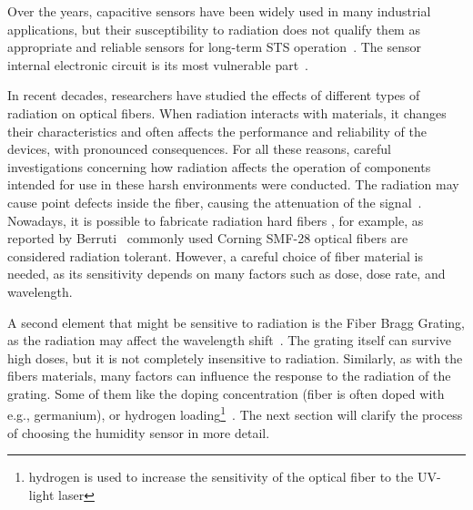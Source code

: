 Over the years, capacitive sensors have been widely used in many industrial applications, but their susceptibility to radiation does not qualify them as appropriate and reliable sensors for long-term \gls{STS} operation~\cite{Kapic, capacitive_irrad, Berruti}. The sensor internal electronic circuit is its most vulnerable part~\cite{SHCHEMEROV20222871}.

In recent decades, researchers have studied the effects of different types of radiation on optical fibers. When radiation interacts with materials, it changes their characteristics and often affects the performance and reliability of the devices, with pronounced consequences. For all these reasons, careful investigations concerning how radiation affects the operation of components intended for use in these harsh environments were conducted. The radiation may cause point defects inside the fiber, causing the attenuation of the signal~\cite{FOS_FIB_RAD}. Nowadays, it is possible to fabricate radiation hard fibers \cite{troska}, for example, as reported by Berruti~\cite{Berruti} commonly used Corning SMF-28 optical fibers are considered radiation tolerant. However, a careful choice of fiber material is needed, as its sensitivity depends on many factors such as dose, dose rate, and wavelength.  

A second element that might be sensitive to radiation is the  Fiber Bragg Grating, as the radiation may affect the wavelength shift~\cite{gusarov}. The grating itself can survive high doses, but it is not completely insensitive to radiation. Similarly, as with the fibers materials, many factors can influence the response to the radiation of the grating. Some of them like the doping concentration (fiber is often doped with e.g., germanium), or hydrogen loading\footnote{hydrogen is used to increase the sensitivity of the optical fiber to the UV-light laser}~\cite{gusarov}. The next section will clarify the process of choosing the humidity sensor in more detail. 


